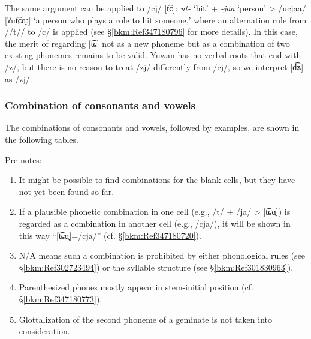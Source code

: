The same argument can be applied to /cj/ [t͡ɕ]: \textit{ut-} ‘hit’ + \textit{{}-jaa} ‘person’ > /ucjaa/ [ʔut͡ɕɑ̟ː] ‘a person who plays a role to hit someone,’ where an alternation rule from //t// to /c/ is applied (see §\ref{bkm:Ref347180796} for more details). In this case, the merit of regarding [t͡ɕ] not as a new phoneme but as a combination of two existing phonemes remains to be valid. Yuwan has no verbal roots that end with /z/, but there is no reason to treat /zj/ differently from /cj/, so we interpret [d͡ʑ] as /zj/.

\subsubsection{Combination of consonants and vowels}
\hypertarget{RefHeadingToc395696976}{}\label{bkm:Ref347177989}\label{bkm:Ref347180694}\label{bkm:Ref347181003}
The combinations of consonants and vowels, followed by examples, are shown in the following tables.

Pre-notes: 

\begin{enumerate}[label=\alph*.]
\item It might be possible to find combinations for the blank cells, but they have not yet been found so far.
\item If a plausible phonetic combination in one cell (e.g., /t/ + /ja/ > [t͡ɕɑ̟]) is regarded as a combination in another cell (e.g., /cja/), it will be shown in this way “[t͡ɕɑ̟]=/cja/” (cf. §\ref{bkm:Ref347180720}).
\item N/A means such a combination is prohibited by either phonological rules (see §\ref{bkm:Ref302723494}) or the syllable structure (see §\ref{bkm:Ref301830963}).
\item Parenthesized phones mostly appear in stem-initial position (cf. §\ref{bkm:Ref347180773}).
\item Glottalization of the second phoneme of a geminate is not taken into consideration.
\end{enumerate}

